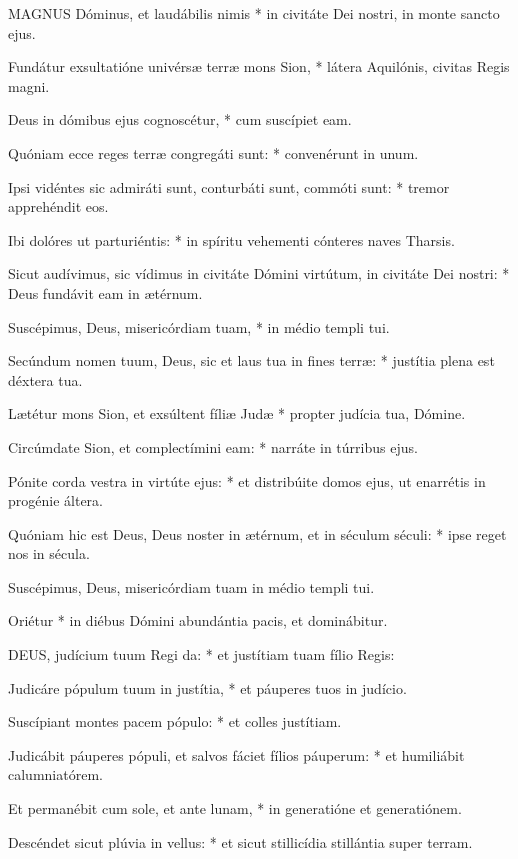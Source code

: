 \lettrine[lines=2]{M}{AGNUS} Dóminus, et laudábilis nimis * in civitáte Dei nostri, in monte sancto ejus.

Fundátur exsultatióne univérsæ terræ mons Sion, * látera Aquilónis, civitas Regis magni.

Deus in dómibus ejus cognoscétur, * cum suscípiet eam.

Quóniam ecce reges terræ congregáti sunt: * convenérunt in unum.

Ipsi vidéntes sic admiráti sunt, conturbáti sunt, commóti sunt: * tremor apprehéndit eos.

Ibi dolóres ut parturiéntis: * in spíritu vehementi cónteres naves Tharsis.

Sicut audívimus, sic vídimus in civitáte Dómini virtútum, in civitáte Dei nostri: * Deus fundávit eam in ætérnum.

Suscépimus, Deus, misericórdiam tuam, * in médio templi tui.

Secúndum nomen tuum, Deus, sic et laus tua in fines terræ: * justítia plena est déxtera tua.

Lætétur mons Sion, et exsúltent fíliæ Judæ * propter judícia tua, Dómine.

Circúmdate Sion, et complectímini eam: * narráte in túrribus ejus.

Pónite corda vestra in virtúte ejus: * et distribúite domos ejus, ut enarrétis in progénie áltera.

Quóniam hic est Deus, Deus noster in ætérnum, et in séculum séculi: * ipse reget nos in sécula.

 Suscépimus, Deus, misericórdiam tuam in médio templi tui.

 Oriétur * in diébus Dómini abundántia pacis, et dominábitur.


\lettrine[lines=2]{D}{EUS}, judícium tuum Regi da: * et justítiam tuam fílio Regis:

Judicáre pópulum tuum in justítia, * et páuperes tuos in judício.

Suscípiant montes pacem pópulo: * et colles justítiam.

Judicábit páuperes pópuli, et salvos fáciet fílios páuperum: * et humiliábit calumniatórem.

Et permanébit cum sole, et ante lunam, * in generatióne et generatiónem.

Descéndet sicut plúvia in vellus: * et sicut stillicídia stillántia super terram.

